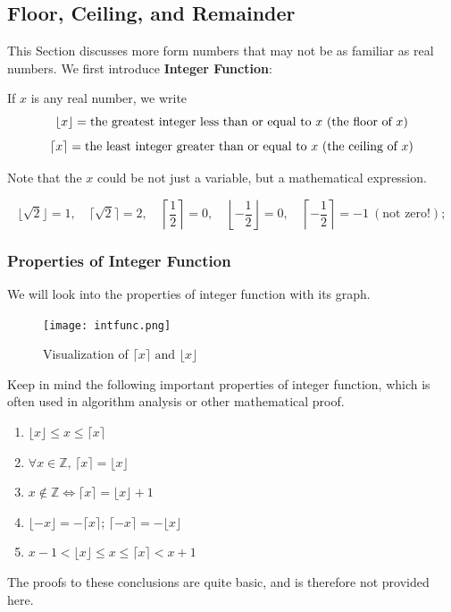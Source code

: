 \documentclass[
	12pt, %
	fleqn, %
	a4paper, %
]{LegrandOrangeBook}
\begin{document}
\subsection{Floor, Ceiling, and Remainder}
This Section discusses more form numbers that may not be as familiar as real numbers. We first introduce 
\textbf{Integer Function}:
\begin{definition}
    If \( x \) is any real number, we write
\[
\lfloor x \rfloor = \text{the greatest integer less than or equal to \( x \) (the floor of \( x \))}
\]
\[
\lceil x \rceil = \text{the least integer greater than or equal to \( x \) (the ceiling of \( x \))}
\]
\end{definition}
Note that the $x$ could be not just a variable, but a mathematical expression.
\begin{example}
    \[
\lfloor \sqrt{2} \rfloor = 1, \quad \lceil \sqrt{2} \rceil = 2, \quad \left\lceil \frac{1}{2} \right\rceil = 0, \quad \left\lfloor -\frac{1}{2} \right\rfloor = 0, \quad \left\lceil -\frac{1}{2} \right\rceil = -1 \ (\text{not zero!});
\]
\end{example}

\subsubsection{Properties of Integer Function}
We will look into the properties of integer function with its graph. 
    \begin{figure}[H]
        \centering
        \texttt{[image: intfunc.png]}
        \caption{Visualization of $\lceil x \rceil \text{ and } \lfloor x \rfloor$}
    \end{figure}

\begin{theorem}
    Keep in mind the following important properties of integer function, which is 
    often used in algorithm analysis or other mathematical proof.
    \begin{enumerate}
        \item $\lfloor x \rfloor \leq x \leq \lceil x \rceil$
        \item  $\forall x\in \mathbb{Z} \text{, } \lceil x \rceil = \lfloor x \rfloor$
        \item $x \notin \mathbb{Z} \iff  \lceil x \rceil =  \lfloor x \rfloor+ 1  $
        \item $\lfloor -x \rfloor = -\lceil x \rceil $; $\lceil-x \rceil = - \lfloor x \rfloor$
        \item $x - 1 < \lfloor x \rfloor \leq x \leq \lceil x \rceil < x + 1$
    \end{enumerate}
\end{theorem}
The proofs to these conclusions are quite basic, and is therefore not provided here.
\end{document}
